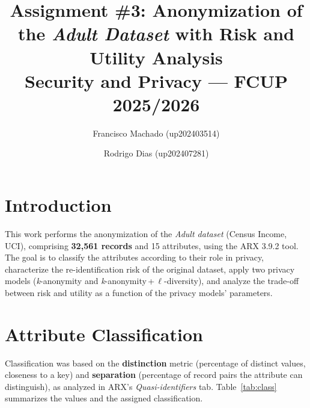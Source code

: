 \documentclass[10pt,a4paper]{article}
\title{%
    \textbf{Assignment \#3: Anonymization of the \textit{Adult Dataset} with Risk and Utility Analysis} \\[0.5em]
    \large Security and Privacy --- FCUP 2025/2026
}
\author{
    Francisco Machado (up202403514) \and
    Rodrigo Dias (up202407281)
}
\begin{document}
\maketitle
\vspace{-0.8cm}

\section{Introduction}
This work performs the anonymization of the \textit{Adult dataset} (Census Income, UCI), comprising
\textbf{32{,}561 records} and 15 attributes, using the ARX 3.9.2 tool. The goal is to classify the attributes
according to their role in privacy, characterize the re-identification risk of the original dataset, apply two
privacy models (\textit{k}-anonymity and \textit{k}-anonymity\,+\,$\ell$-diversity), and analyze the trade-off
between risk and utility as a function of the privacy models' parameters.

\section{Attribute Classification}
Classification was based on the \textbf{distinction} metric (percentage of distinct values, closeness to a
key) and \textbf{separation} (percentage of record pairs the attribute can distinguish), as analyzed in ARX's
\textit{Quasi-identifiers} tab. Table~\ref{tab:class} summarizes the values and the assigned classification.
\end{document}
